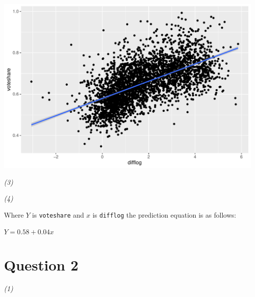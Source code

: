 \documentclass[12pt,letterpaper]{article}
\begin{document}
 
\includegraphics{vdPlot.pdf}
\vspace{.25cm}

\textit{(3)}\\ 
\vspace{.25cm}
 
\vspace{.25cm}

\textit{(4)}\\ 
\vspace{.25cm}

\noindent Where $Y$ is \texttt{voteshare} and $x$ is \texttt{difflog} the prediction equation is as follows:

$Y = 0.58 + 0.04x$

\clearpage

\section*{Question 2}

\textit{(1)}\\ 

\vspace{.25cm}
\end{document}
